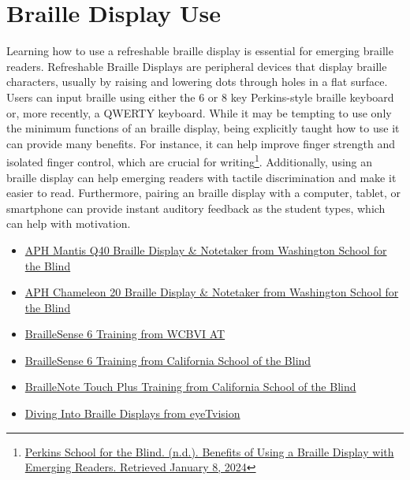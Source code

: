 \pagebreak\hypertarget{appx10}{}\section[Braille Display Use]{Braille Display Use}\label{appx10}
Learning how to use a refreshable braille display is essential for emerging braille readers. Refreshable Braille Displays are peripheral devices that display braille characters, usually by raising and lowering dots through holes in a flat surface. Users can input braille using either the 6 or 8 key Perkins-style braille keyboard or, more recently, a QWERTY keyboard.  While it may be tempting to use only the minimum functions of an braille display, being explicitly taught how to use it can provide many benefits. For instance, it can help improve finger strength and isolated finger control, which are crucial for writing\footnote{\raggedright \href{https://www.perkins.org/resource/benefits-using-braille-display-emerging-readers/}{Perkins School for the Blind. (n.d.). Benefits of Using a Braille Display with Emerging Readers. Retrieved January 8, 2024}}. Additionally, using an braille display can help emerging readers with tactile discrimination and make it easier to read. Furthermore, pairing an braille display with a computer, tablet, or smartphone can provide instant auditory feedback as the student types, which can help with motivation.
\begin{itemize}[leftmargin=*]
\item \href{https://view.officeapps.live.com/op/view.aspx?src=https\%3A\%2F\%2Fwww.wssb.wa.gov\%2Fsites\%2Fdefault\%2Ffiles\%2F2021-10\%2FUsing\%2520APH\%2520Mantis\%2520Q40.docx&wdOrigin=BROWSELINK}{APH Mantis Q40 Braille Display \& Notetaker from Washington School for the Blind}
\item \href{https://view.officeapps.live.com/op/view.aspx?src=https\%3A\%2F\%2Fwww.wssb.wa.gov\%2Fsites\%2Fdefault\%2Ffiles\%2F2023-07\%2FUsing\%2520APH\%2520Chameleon\%252020.docx&wdOrigin=BROWSELINK}{APH Chameleon 20 Braille Display \& Notetaker from Washington School for the Blind}
\item \href{https://drive.google.com/drive/folders/1V\_hXjrsDeKUbNImA6Q77joADQbqMKKKl}{BrailleSense 6 Training from WCBVI AT} 
\item \href{https://drive.google.com/drive/folders/10HeixUb4E21nPLCStmnrsxLVehKThPP}{BrailleSense 6 Training from California School of the Blind} 
\item \href{https://drive.google.com/drive/folders/1OKBBdjbbD6asrE4dYyP7do9EWvY--5wf}{BrailleNote Touch Plus Training from California School of the Blind} 
\item \href{https://eyetvision.org/}{Diving Into Braille Displays from eyeTvision}
\end{itemize}


